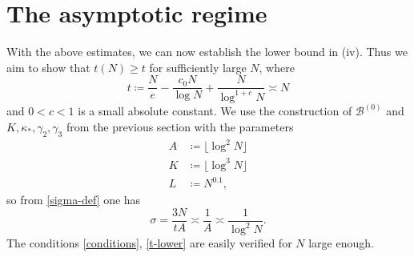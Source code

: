 \documentclass[10pt,a4paper,reqno]{amsart}
\numberwithin{equation}{section}
\theoremstyle{plain}
\theoremstyle{definition}
\newcommand\tuple{{\mathcal B}}
\begin{document}
\section{The asymptotic regime}

With the above estimates, we can now establish the lower bound in (iv).  Thus we aim to show that $t(N) \geq t$ for sufficiently large $N$, where
\begin{equation}\label{main-lower}
   t \coloneqq \frac{N}{e} - \frac{c_0 N}{\log N} + \frac{N}{\log^{1+c} N} \asymp N
\end{equation}
and $0 < c < 1$ is a small absolute constant. We use the construction of $\tuple^{(0)}$ and  $K, \kappa_*, \gamma_2, \gamma_3$ from the previous section with the parameters
\begin{align}
  A &\coloneqq \lfloor \log^2 N \rfloor\label{a-asym}\\
K &\coloneqq \lfloor \log^3 N \rfloor \label{k-asym} \\
L &\coloneqq N^{0.1},\label{l-asym}
\end{align}
so from \eqref{sigma-def} one has
\begin{equation}\label{sigma-alt}
   \sigma = \frac{3N}{tA} \asymp \frac{1}{A} \asymp \frac{1}{\log^2 N}.
\end{equation}
The conditions \eqref{conditions}, \eqref{t-lower} are easily verified for $N$ large enough.
\end{document}
